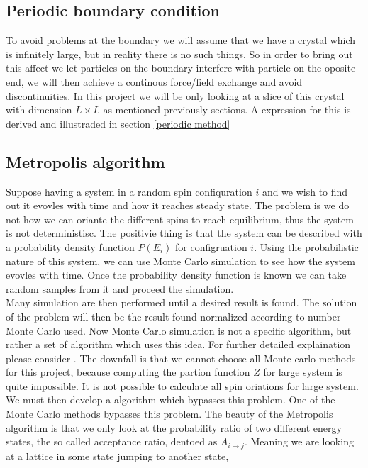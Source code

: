 \documentclass[a4paper, 10pt]{article}
\begin{document}
\subsection{Periodic boundary condition \label{periodic theory}} To avoid problems at the boundary we will assume that we have a crystal
which is infinitely large, but in reality there is no such things. So in order to bring out this affect
we let particles on the boundary interfere with particle on the oposite end, we will then achieve a
continous force/field exchange and avoid discontinuities. In this project we will be only looking at a slice of this crystal
with dimension $L\times L$ as mentioned previously sections. A expression for this is derived and illustraded
in section \eqref{periodic method}
\subsection{Metropolis algorithm \label{metropolis theory}}
Suppose having a system in a random spin confiquration $i$ and we wish to find out it evovles with
time and how it reaches steady state. The problem is we do not how we can oriante the different spins
to reach equilibrium, thus the system is not deterministisc. The positivie thing is that the system
can be described with a probability density function $P(E_{i})$ for configruation $i$. Using the probabilistic nature
of this system, we can use Monte Carlo simulation to see how the system evovles with time. Once the probability
density function is known we can take random samples from it and proceed the simulation.
\vspace{3mm}
\\
Many simulation are then performed until a desired result is found. The solution of the problem will then be the result found normalized according to number
Monte Carlo used.  Now Monte Carlo simulation is not a specific algorithm, but rather a set of algorithm which uses
this idea. For further detailed explaination please consider \cite{morten}. The downfall is that we cannot choose all Monte carlo methods for this project, because computing the partion function $Z$ for large system is quite impossible.
It is not possible to calculate all spin oriations for large system.
We must then develop a algorithm which bypasses this problem. One of the Monte Carlo methods bypasses this problem.
The beauty of the
Metropolis algorithm is that we only look at the probability ratio of two different energy states, the so called acceptance ratio, dentoed as $A_{i\to j}$. Meaning we are looking at a lattice in some state jumping to another state,
\end{document}
